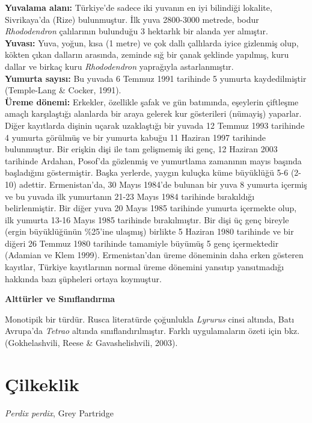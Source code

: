 \documentclass[
  a4paper,
  DIV=11,
  numbers=noendperiod]{scrreprt}
\begin{document}
\textbf{Yuvalama alanı:} Türkiye'de sadece iki yuvanın en iyi bilindiği
lokalite, Sivrikaya'da (Rize) bulunmuştur. İlk yuva 2800-3000 metrede,
bodur \emph{Rhododendron} çalılarının bulunduğu 3 hektarlık bir alanda
yer almıştır.\\
\textbf{Yuvası:} Yuva, yoğun, kısa (1 metre) ve çok dallı çallılarda
iyice gizlenmiş olup, kökten çıkan dalların arasında, zeminde sığ bir
çanak şeklinde yapılmış, kuru dallar ve birkaç kuru \emph{Rhododendron}
yaprağıyla astarlanmıştır.\\
\textbf{Yumurta sayısı:} Bu yuvada 6 Temmuz 1991 tarihinde 5 yumurta
kaydedilmiştir (Temple-Lang \& Cocker, 1991).\\
\textbf{Üreme dönemi:} Erkekler, özellikle şafak ve gün batımında,
eşeylerin çiftleşme amaçlı karşılaştığı alanlarda bir araya gelerek kur
gösterileri (nümayiş) yaparlar. Diğer kayıtlarda dişinin uçarak
uzaklaştığı bir yuvada 12 Temmuz 1993 tarihinde 4 yumurta görülmüş ve
bir yumurta kabuğu 11 Haziran 1997 tarihinde bulunmuştur. Bir erişkin
dişi ile tam gelişmemiş iki genç, 12 Haziran 2003 tarihinde Ardahan,
Posof'da gözlenmiş ve yumurtlama zamanının mayıs başında başladığını
göstermiştir. Başka yerlerde, yaygın kuluçka küme büyüklüğü 5-6 (2-10)
adettir. Ermenistan'da, 30 Mayıs 1984'de bulunan bir yuva 8 yumurta
içermiş ve bu yuvada ilk yumurtanın 21-23 Mayıs 1984 tarihinde
bırakıldığı belirlenmiştir. Bir diğer yuva 20 Mayıs 1985 tarihinde
yumurta içermekte olup, ilk yumurta 13-16 Mayıs 1985 tarihinde
bırakılmıştır. Bir dişi üç genç bireyle (ergin büyüklüğünün \%25'ine
ulaşmış) birlikte 5 Haziran 1980 tarihinde ve bir diğeri 26 Temmuz 1980
tarihinde tamamiyle büyümüş 5 genç içermektedir (Adamian ve Klem 1999).
Ermenistan'dan üreme döneminin daha erken gösteren kayıtlar, Türkiye
kayıtlarının normal üreme dönemini yansıtıp yansıtmadığı hakkında bazı
şüpheleri ortaya koymuştur.

\textbf{Alttürler ve Sınıflandırma}

Monotipik bir türdür. Rusca literatürde çoğunlukla \emph{Lyrurus} cinsi
altında, Batı Avrupa'da \emph{Tetrao} altında sınıflandırılmıştır.
Farklı uygulamaların özeti için bkz. (Gokhelashvili, Reese \&
Gavashelishvili, 2003).

\section{Çilkeklik}\label{uxe7ilkeklik}

\emph{Perdix perdix}, Grey Partridge
\end{document}
